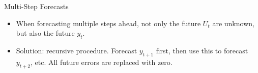 \begin{frame}{Multi-Step Forecasts}
\begin{itemize}
\item When forecasting multiple steps ahead, not only the future $U_t$ are unknown, but also the future $y_t$.
\item Solution: recursive procedure. Forecast $y_{t+1}$ first, then use this to forecast $y_{t+2}$, etc. All future errors are replaced with zero.
\end{itemize}
\end{frame}

